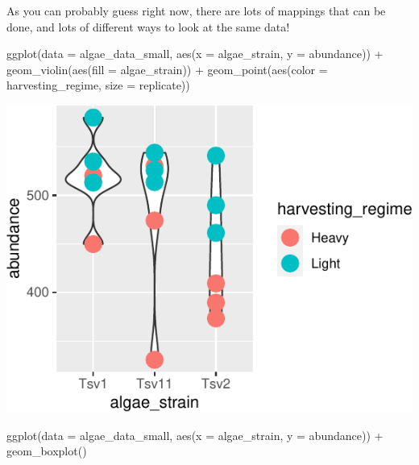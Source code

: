 \documentclass[
]{krantz}
\newenvironment{Shaded}{\begin{snugshade}}{\end{snugshade}}
\newcommand{\AttributeTok}[1]{\textcolor[rgb]{0.77,0.63,0.00}{#1}}
\newcommand{\FunctionTok}[1]{\textcolor[rgb]{0.00,0.00,0.00}{#1}}
\newcommand{\NormalTok}[1]{#1}
\newcommand{\SpecialCharTok}[1]{\textcolor[rgb]{0.00,0.00,0.00}{#1}}
\begin{document}
As you can probably guess right now, there are lots of mappings that can be done, and lots of different ways to look at the same data!

\begin{Shaded}
\begin{Highlighting}[]
\FunctionTok{ggplot}\NormalTok{(}\AttributeTok{data =}\NormalTok{ algae\_data\_small, }\FunctionTok{aes}\NormalTok{(}\AttributeTok{x =}\NormalTok{ algae\_strain, }\AttributeTok{y =}\NormalTok{ abundance)) }\SpecialCharTok{+}
  \FunctionTok{geom\_violin}\NormalTok{(}\FunctionTok{aes}\NormalTok{(}\AttributeTok{fill =}\NormalTok{ algae\_strain)) }\SpecialCharTok{+}
  \FunctionTok{geom\_point}\NormalTok{(}\FunctionTok{aes}\NormalTok{(}\AttributeTok{color =}\NormalTok{ harvesting\_regime, }\AttributeTok{size =}\NormalTok{ replicate))}
\end{Highlighting}
\end{Shaded}

\begin{center}\includegraphics{index_files/figure-latex/unnamed-chunk-27-1} \end{center}

\begin{Shaded}
\begin{Highlighting}[]
\FunctionTok{ggplot}\NormalTok{(}\AttributeTok{data =}\NormalTok{ algae\_data\_small, }\FunctionTok{aes}\NormalTok{(}\AttributeTok{x =}\NormalTok{ algae\_strain, }\AttributeTok{y =}\NormalTok{ abundance)) }\SpecialCharTok{+}
  \FunctionTok{geom\_boxplot}\NormalTok{()}
\end{Highlighting}
\end{Shaded}
\end{document}
